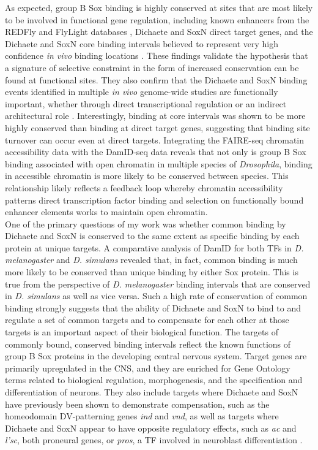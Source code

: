 As expected, group B Sox binding is highly conserved at sites that are most likely to be involved in functional gene regulation, including known enhancers from the REDFly and FlyLight databases \citep{gallo_redfly_2010,manning_resource_2012}, Dichaete and SoxN direct target genes, and the Dichaete and SoxN core binding intervals believed to represent very high confidence \emph{in vivo} binding locations \citep{aleksic_role_2013,ferrero_soxneuro_2014}. These findings validate the hypothesis that a signature of selective constraint in the form of increased conservation can be found at functional sites. They also confirm that the Dichaete and SoxN binding events identified in multiple \emph{in vivo} genome-wide studies are functionally important, whether through direct transcriptional regulation or an indirect architectural role \citep{russell_dichaete_1996}. Interestingly, binding at core intervals was shown to be more highly conserved than binding at direct target genes, suggesting that binding site turnover can occur even at direct targets. Integrating the FAIRE-seq chromatin accessibility data with the DamID-seq data reveals that not only is group B Sox binding associated with open chromatin in multiple species of \emph{Drosophila}, binding in accessible chromatin is more likely to be conserved between species. This relationship likely reflects a feedback loop whereby chromatin accessibility patterns direct transcription factor binding and selection on functionally bound enhancer elements works to maintain open chromatin.\\

One of the primary questions of my work was whether common binding by Dichaete and SoxN is conserved to the same extent as specific binding by each protein at unique targets. A comparative analysis of DamID for both TFs in \emph{D. melanogaster} and \emph{D. simulans} revealed that, in fact, common binding is much more likely to be conserved than unique binding by either Sox protein. This is true from the perspective of \emph{D. melanogaster} binding intervals that are conserved in \emph{D. simulans} as well as vice versa. Such a high rate of conservation of common binding strongly suggests that the ability of Dichaete and SoxN to bind to and regulate a set of common targets and to compensate for each other at those targets is an important aspect of their biological function. The targets of commonly bound, conserved binding intervals reflect the known functions of group B Sox proteins in the developing central nervous system. Target genes are primarily upregulated in the CNS, and they are enriched for Gene Ontology terms related to biological regulation, morphogenesis, and the specification and differentiation of neurons. They also include targets where Dichaete and SoxN have previously been shown to demonstrate compensation, such as the homeodomain DV-patterning genes \emph{ind} and \emph{vnd}, as well as targets where Dichaete and SoxN appear to have opposite regulatory effects, such as \emph{ac} and \emph{l'sc}, both proneural genes, or \emph{pros}, a TF involved in neuroblast differentiation \citep{aleksic_role_2013,ferrero_soxneuro_2014,overton_evidence_2002}.\\

